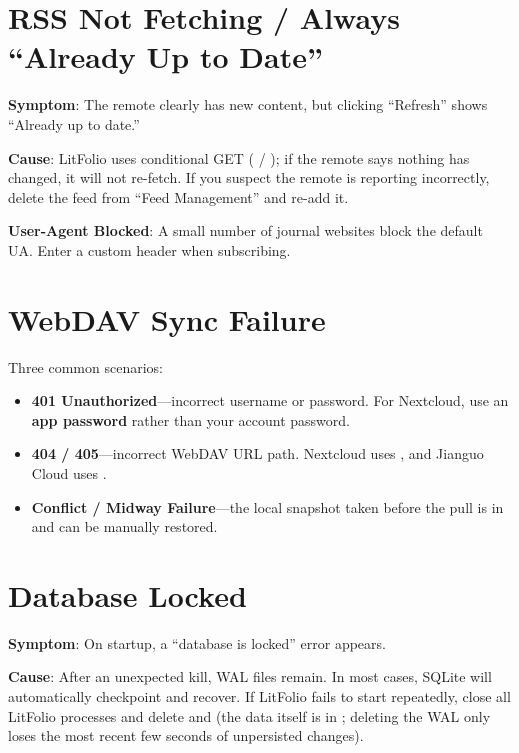 \section{RSS Not Fetching / Always ``Already Up to Date''}

\textbf{Symptom}: The remote clearly has new content, but clicking ``Refresh'' shows
``Already up to date.''

\textbf{Cause}: LitFolio uses conditional GET ( / );
if the remote says nothing has changed, it will not re-fetch. If you suspect the remote
is reporting incorrectly, delete the feed from ``Feed Management'' and re-add it.

\textbf{User-Agent Blocked}: A small number of journal websites block the default UA.
Enter a custom  header when subscribing.

\section{WebDAV Sync Failure}

Three common scenarios:

\begin{itemize}
  \item \textbf{401 Unauthorized}---incorrect username or password. For Nextcloud, use
    an \textbf{app password} rather than your account password.
  \item \textbf{404 / 405}---incorrect WebDAV URL path. Nextcloud uses
    , and Jianguo Cloud uses
    .
  \item \textbf{Conflict / Midway Failure}---the local snapshot taken before the pull
    is in  and can be manually restored.
\end{itemize}

\section{Database Locked}

\textbf{Symptom}: On startup, a ``database is locked'' error appears.

\textbf{Cause}: After an unexpected kill, WAL files remain. In most cases, SQLite will
automatically checkpoint and recover. If LitFolio fails to start repeatedly, close all
LitFolio processes and delete  and  (the
data itself is in ; deleting the WAL only loses the most recent few
seconds of unpersisted changes).


